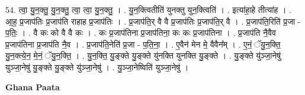 \documentclass[17pt]{extarticle}
\begin{document}
54. त्वा॒ यु॒न॒क्तु॒ यु॒न॒क्तु॒ त्वा॒ त्वा॒ यु॒न॒क्तु॒ । . यु॒न॒क्त्वितीति॑ युनक्तु युन॒क्त्विति॑ । . इत्या॑हा॒हे तीत्या॑ह । . आ॒ह॒ प्र॒जाप॑तिः प्र॒जाप॑ति राहाह प्र॒जाप॑तिः । . प्र॒जाप॑ति॒र् वै वै प्र॒जाप॑तिः प्र॒जाप॑ति॒र् वै । . प्र॒जाप॑ति॒रिति॑ प्र॒जा - प॒तिः॒ । . वै कः को वै वै कः । . कः प्र॒जाप॑तिना प्र॒जाप॑तिना॒ कः कः प्र॒जाप॑तिना । . प्र॒जाप॑ति नै॒वैव प्र॒जाप॑तिना प्र॒जाप॑ति नै॒व । . प्र॒जाप॑ति॒नेति॑ प्र॒जा - प॒ति॒ना॒ । . ए॒वैन॑ मेन मे॒ वैवैन᳚म् । . ए॒नं॒ ॅयु॒न॒क्ति॒ यु॒न॒क्त्ये॒न॒ मे॒नं॒ ॅयु॒न॒क्ति॒ । . यु॒न॒क्ति॒ यु॒ङ्क्ते यु॒ङ्क्ते यु॑नक्ति युनक्ति यु॒ङ्क्ते । . यु॒ङ्क्ते यु॑ञ्जा॒नेषु॑ युञ्जा॒नेषु॑ यु॒ङ्क्ते यु॒ङ्क्ते यु॑ञ्जा॒नेषु॑ । . यु॒ञ्जा॒नेष्विति॑ युञ्जा॒नेषु॑ । \newline

\textbf{Ghana Paata } \newline
\end{document}
